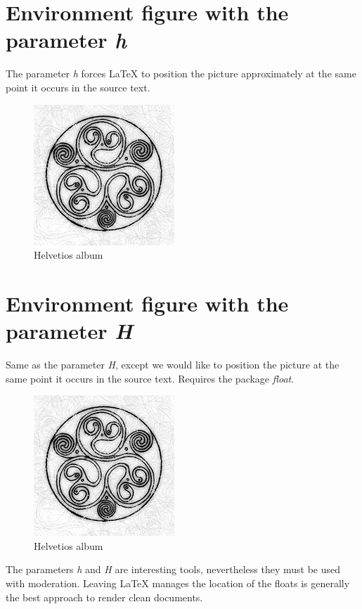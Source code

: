 \documentclass{article}
\begin{document}
\clearpage

\section*{Environment figure with the parameter \emph{h}}

The parameter \emph{h} forces \LaTeX{} to position the picture approximately at the same point it occurs in the source text.


\begin{figure}[h]
	\centering
	\includegraphics[scale=0.5]{helvetios}
	\caption{Helvetios album}
\end{figure}

\clearpage

\section*{Environment figure with the parameter \emph{H}}

Same as the parameter \emph{H}, except we would like to position the picture at the same point it occurs in the source text. Requires the package \emph{float}.

\begin{figure}[H]
	\centering
	\includegraphics[scale=0.5]{helvetios}
	\caption{Helvetios album}
\end{figure}

The parameters \emph{h} and \emph{H} are interesting tools, nevertheless they must be used with moderation. Leaving \LaTeX{} manages the location of the floats is generally the best approach to render clean documents.
\end{document}
